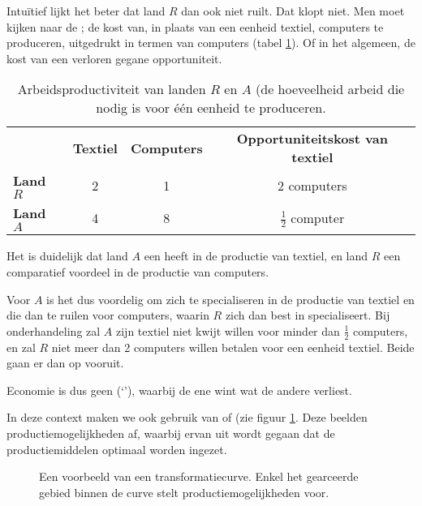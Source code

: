 Intu\"itief lijkt het beter dat land $R$ dan ook niet ruilt. Dat klopt niet. Men moet kijken naar de  ; de kost van, in plaats van een eenheid textiel, computers te produceren, uitgedrukt in termen van computers (tabel \ref{tab:h1oppkosten}). Of in het algemeen, de kost van een verloren gegane opportuniteit.

\begin{table}[H]
\small\centering\captionsetup{justification=centering,margin=2cm}
\begin{tabular}{l | c | c | c}
 & \textbf{Textiel} & \textbf{Computers} & \textbf{Opportuniteitskost van textiel} \\
\textbf{Land $R$} & 2 & 1 & 2 computers\\
\textbf{Land $A$} & 4 & 8 & $\frac{1}{2}$ computer \\
\end{tabular}
\caption{Arbeidsproductiviteit van landen $R$ en $A$ (de hoeveelheid arbeid die nodig is voor \'e\'en eenheid te produceren.}
\label{tab:h1oppkosten}
\end{table}

Het is duidelijk dat land $A$ een  heeft in de productie van textiel, en land $R$ een comparatief voordeel in de productie van computers.
\par Voor $A$ is het dus voordelig om zich te specialiseren in de productie van textiel en die dan te ruilen voor computers, waarin $R$ zich dan best in specialiseert. Bij onderhandeling zal $A$ zijn textiel niet kwijt willen voor minder dan $\frac{1}{2}$ computers, en zal $R$ niet meer dan 2 computers willen betalen voor een eenheid textiel. Beide gaan er dan op vooruit.
\par Economie is dus geen  (`'), waarbij de ene wint wat de andere verliest.\\

\par In deze context maken we ook gebruik van  of  (zie figuur \ref{fig:h1tc}. Deze beelden productiemogelijkheden af, waarbij ervan uit wordt gegaan dat de productiemiddelen optimaal worden ingezet.

\begin{figure}[H]
\vspace{0.5cm}
\centering
\captionsetup{justification=centering,margin=2cm}
\caption{Een voorbeeld van een transformatiecurve. Enkel het gearceerde gebied binnen de curve stelt productiemogelijkheden voor.}
\label{fig:h1tc}
\end{figure}

